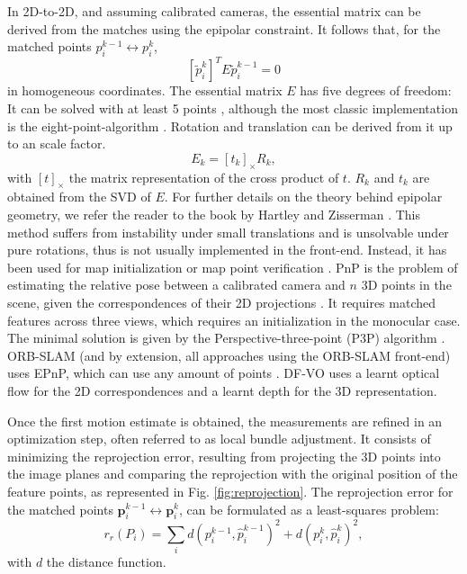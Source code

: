 In {2D-to-2D}, and assuming calibrated cameras, the essential matrix can be derived from the matches using the epipolar constraint. It follows that, for the matched points $p^{k-1}_i \leftrightarrow p^{k}_i$,    \begin{equation}
        \left[ \tilde{p}^{k}_i \right]^T E \tilde{p}^{k-1}_i = 0
    \end{equation}
    in homogeneous coordinates. The essential matrix $E$ has five degrees of freedom: It can be solved with at least 5 points \cite{nister2004-5point}, although the most classic implementation is the eight-point-algorithm \cite{hartley1997-8point}.
    Rotation and translation can be derived from it up to an scale factor.
    \begin{equation}
        E_k = [t_k]_\times R_k, 
    \end{equation}
    with $[t]_\times$ the matrix representation of the cross product of $t$. $R_k$ and $t_k$ are obtained from the \ac{SVD} of $E$. For further details on the theory behind epipolar geometry, we refer the reader to the book by Hartley and Zisserman \cite{heyden2005multiplevgHyZ}. This method suffers from instability under small translations and is unsolvable under pure rotations, thus is not usually implemented in the front-end. Instead, it has been used for map initialization \cite{butt2020epipolarinitializ} or map point verification \cite{mur2015orb}. 
PnP is the problem of estimating the relative pose between a calibrated camera and $n$ 3D points in the scene, given the correspondences of their 2D projections \cite{fischler1981RANSACpnp}. It requires matched features across three views, which requires an initialization in the monocular case. The minimal solution is given by the Perspective-three-point (P3P) algorithm \cite{gao2003p3p}. ORB-SLAM \cite{mur2015orb} (and by extension, all approaches using the ORB-SLAM front-end) uses EPnP, which can use any amount of points \cite{lepetit2009epnp}. DF-VO \cite{zhan2019dfvo} uses a learnt optical flow for the 2D correspondences and a learnt depth for the 3D representation.






Once the first motion estimate is obtained, the measurements are refined in an optimization step, often referred to as local bundle adjustment. 
It consists of minimizing the reprojection error, resulting from projecting the 3D points into the image planes and comparing the reprojection with the original position of the feature points, as represented in Fig. \ref{fig:reprojection}. 
The reprojection error for the matched points $\textbf{p}^{k-1}_i \leftrightarrow \textbf{p}^{k}_i$, can be formulated as a least-squares problem:
\begin{equation}
     r_{r}(P_i) = \sum_id(p^{k-1}_i,\hat{p}^{k-1}_i)^2+d(p^{k}_i,\hat{p}^{k}_i)^2,
\end{equation}
with $d$ the distance function. 





